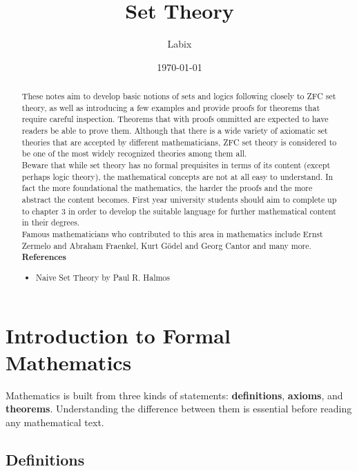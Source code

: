 \documentclass[a4paper]{article}
\title{Set Theory}
\author{Labix}
\date{\today}
\begin{document}
\maketitle
\begin{abstract}
These notes aim to develop basic notions of sets and logics following closely to ZFC set theory, as well as introducing a few examples and provide proofs for theorems that require careful inspection. Theorems that with proofs ommitted are expected to have readers be able to prove them. Although that there is a wide variety of axiomatic set theories that are accepted by different mathematicians, ZFC set theory is considered to be one of the most widely recognized theories among them all. \\

Beware that while set theory has no formal prequisites in terms of its content (except perhaps logic theory), the mathematical concepts are not at all easy to understand. In fact the more foundational the mathematics, the harder the proofs and the more abstract the content becomes. First year university students should aim to complete up to chapter $3$ in order to develop the suitable language for further mathematical content in their degrees. \\

Famous mathematicians who contributed to this area in mathematics include Ernst Zermelo and Abraham Fraenkel, Kurt Gödel and Georg Cantor and many more. \\
\textbf{References}
\begin{itemize}
\item Naive Set Theory by Paul R. Halmos
\end{itemize}
\end{abstract}
\pagebreak
\tableofcontents

\pagebreak
\section*{Introduction to Formal Mathematics}

Mathematics is built from three kinds of statements: \textbf{definitions},
\textbf{axioms}, and \textbf{theorems}. Understanding the difference between
them is essential before reading any mathematical text.

\subsection*{Definitions}
\end{document}
